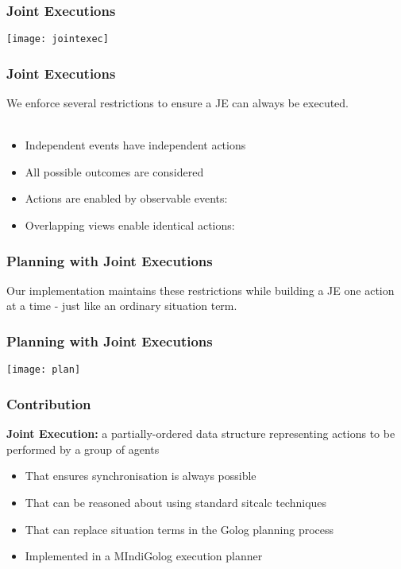\documentclass{beamer}
\begin{document}
\begin{frame}
\frametitle{Joint Executions}
\begin{center}
  \texttt{[image: jointexec]}
\end{center}
\end{frame}

\begin{frame}
\frametitle{Joint Executions}
We enforce several restrictions to ensure a JE can always be executed.
\ \\
\ \\
\begin{itemize}
\item Independent events have independent actions
\item All possible outcomes are considered
\item Actions are enabled by observable events:
\item Overlapping views enable identical actions:
\end{itemize}
\end{frame}

\begin{frame}
\frametitle{Planning with Joint Executions}
Our implementation maintains these restrictions while building a JE one action 
at a time - just like an ordinary situation term.


\end{frame}

\begin{frame}
\frametitle{Planning with Joint Executions}

\begin{center}
  \texttt{[image: plan]}
\end{center}

\end{frame}

\begin{frame}
\frametitle{Contribution}
\textbf{Joint Execution:}  a partially-ordered data structure representing actions to be performed by a group of agents
\begin{itemize}
\item That ensures synchronisation is always possible
\item That can be reasoned about using standard sitcalc techniques
\item That can replace situation terms in the Golog planning process
\item Implemented in a MIndiGolog execution planner
\end{itemize}
\end{frame}
\end{document}
